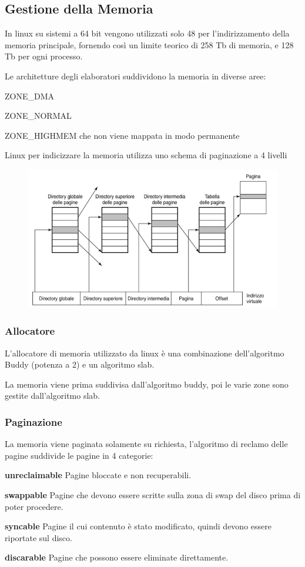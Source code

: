 \subsection{Gestione della Memoria}
In linux su sistemi a 64 bit vengono utilizzati solo 48 per l'indirizzamento della memoria principale, fornendo così un limite teorico di 258 Tb di memoria, e 128 Tb per ogni processo.

\spacer
Le architetture degli elaboratori suddividono la memoria in diverse aree:
\begin{sitemize}
    \item ZONE\_DMA
    \item ZONE\_NORMAL
    \item ZONE\_HIGHMEM che non viene mappata in modo permanente
\end{sitemize}

\spacer
Linux per indicizzare la memoria utilizza uno schema di paginazione a 4 livelli

\begin{figure}[H]
    \centering
    \includegraphics[width=0.5\linewidth]{assets/linux-pager.png}
\end{figure}

\subsubsection{Allocatore}
L'allocatore di memoria utilizzato da linux è una combinazione dell'algoritmo Buddy (potenza a 2) e un algoritmo slab.

La memoria viene prima suddivisa dall'algoritmo buddy, poi le varie zone sono gestite dall'algoritmo slab.

\subsubsection{Paginazione}
La memoria viene paginata solamente su richiesta, l'algoritmo di reclamo delle pagine suddivide le pagine in 4 categorie:

\begin{sitemize}
    \item \textbf{unreclaimable} Pagine bloccate e non recuperabili.
    \item \textbf{swappable} Pagine che devono essere scritte sulla zona di swap del disco prima di poter procedere.
    \item \textbf{syncable} Pagine il cui contenuto è stato modificato, quindi devono essere riportate sul disco.
    \item \textbf{discarable} Pagine che possono essere eliminate direttamente.
\end{sitemize}

